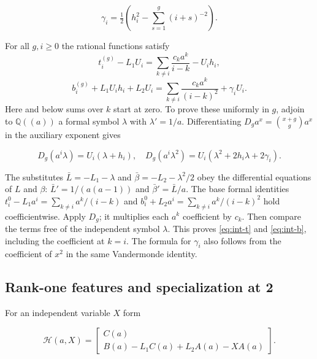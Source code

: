 \[
 \gamma_i=\tfrac12\left(h_i^2-\sum_{s=1}^g(i+s)^{-2}\right).
\]

For all \(g,i\ge0\) the rational functions satisfy
\begin{equation}\label{eq:int-t}
 t_i^{(g)}-L_1U_i=\sum_{k\ne i}\frac{c_ka^k}{i-k}-U_i h_i,
\end{equation}
\begin{equation}\label{eq:int-b}
 b_i^{(g)}+L_1U_i h_i+L_2U_i
       =\sum_{k\ne i}\frac{c_ka^k}{(i-k)^2}+\gamma_iU_i.
\end{equation}
Here and below sums over \(k\) start at zero. To prove these uniformly in
\(g\), adjoin to \(\mathbb Q((a))\) a formal symbol \(\lambda\) with
\(\lambda'=1/a\). Differentiating \(D_g a^x=\binom{x+g}{g}a^x\) in the
auxiliary exponent gives

\[
 D_g(a^i\lambda)=U_i(\lambda+h_i),\quad
 D_g(a^i\lambda^2)=U_i(\lambda^2+2h_i\lambda+2\gamma_i).
\]

The substitutes \(\bar L=-L_1-\lambda\) and
\(\bar\beta=-L_2-\lambda^2/2\) obey the differential equations of \(L\) and
\(\beta\): \(\bar L'=1/(a(a-1))\) and \(\bar\beta'=\bar L/a\). The base
formal identities \(t_i^0-L_1a^i=\sum_{k\ne i}a^k/(i-k)\) and
\(b_i^0+L_2a^i=\sum_{k\ne i}a^k/(i-k)^2\) hold coefficientwise. Apply
\(D_g\); it multiplies each \(a^k\) coefficient by \(c_k\). Then compare the
terms free of the independent symbol \(\lambda\). This proves
\eqref{eq:int-t} and \eqref{eq:int-b}, including the coefficient at
\(k=i\). The formula for \(\gamma_i\) also follows from the coefficient of
\(x^2\) in the same Vandermonde identity.

\subsection{Rank-one features and specialization at 2}

For an independent variable \(X\) form

\[
 \mathcal H(a,X)=\begin{bmatrix}C(a)\\
                B(a)-L_1C(a)+L_2A(a)-XA(a)\end{bmatrix}.
\]

